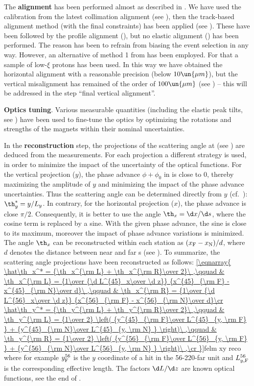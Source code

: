 \> The {\bf alignment} has been performed almost as described in . We have used the  calibration from the latest collimation alignment (see ), then the track-based alignment method (with the final constraints) has been applied (see ). These have been followed by the profile alignment (), but no elastic alignment () has  been performed. The reason has been to refrain from biasing the event selection in any way. However, an alternative of method 1 from  has been employed. For that a sample of low-$\xi$ protons has been used. In this way we have obtained the horizontal alignment with a reasonable precision (below $10\un{\mu m}$), but the vertical misalignment has remained of the order of $100\un{\mu m}$ (see ) -- this will be addressed in the step ``final vertical alignment''.

\> {\bf Optics tuning}. Various measurable quantities (including the elastic peak tilts, see ) have been used to fine-tune the optics by optimizing the rotations and strengths of the  magnets within their nominal uncertainties.

\> In the {\bf reconstruction} step, the projections of the scattering angle at  (see ) are deduced from the  measurements. For each projection a different strategy is used, in order to minimize the impact of the uncertainty of the optical functions. For the vertical projection ($y$), the phase advance $\phi+\phi_0$ in  is close to $0$, thereby maximizing the amplitude of $y$ and minimizing the impact of the phase advance uncertainties. Thus the scattering angle can be determined directly from $y$ (cf.~): $\th_y^* = y/L_y$. In contrary, for the horizontal projection ($x$), the phase advance is close $\pi/2$. Consequently, it is better to use the angle $\th_x = \d x/\d s$, where the cosine term is replaced by a sine. With the given phase advance, the sine is close to its maximum, moreover the impact of phase advance variations is minimized. The angle $\th_x$ can be reconstructed within each station as $(x_{\rm F} - x_{\rm N}) / d$, where $d$ denotes the distance between near and far s (see ). To summarize, the scattering angle projections have been reconstructed as follows:
\eqref{\eqnarray{
	\hat\th_x^* = {\th_x^{\rm L} + \th_x^{\rm R}\over 2}\ ,\qquad
		& \th_x^{\rm L} = {1\over {\d L^{45}_x\over \d z}} {x^{45}_{\rm F} - x^{45}_{\rm N}\over d}\ ,\qquad
		& \th_x^{\rm R} = {1\over {\d L^{56}_x\over \d z}} {x^{56}_{\rm F} - x^{56}_{\rm N}\over d}\cr
	\hat\th_y^* = {\th_y^{\rm L} + \th_y^{\rm R}\over 2}\ ,\qquad
		& \th_y^{\rm L} = {1\over 2} \left( {y^{45}_{\rm F}\over L^{45}_{y, \rm F} } + {y^{45}_{\rm N}\over L^{45}_{y, \rm N} } \right)\ ,\qquad
		& \th_y^{\rm R} = {1\over 2} \left( {y^{56}_{\rm F}\over L^{56}_{y, \rm F} } + {y^{56}_{\rm N}\over L^{56}_{y, \rm N} } \right)\ ,\cr
}}{felm xy reco}
where for example $y^{56}_{\rm F}$ is the $y$ coordinate of a hit in the 56-220-far unit and $L^{56}_{y, \rm F}$ is the corresponding effective length. The factors $\d L/\d z$ are known optical functions, see the end of .

